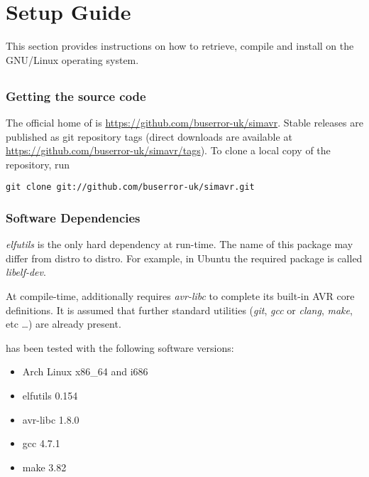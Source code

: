 \chapter{Setup Guide} \label{chapter:setup}

This section provides instructions on how to retrieve, compile and install
\simavr on the GNU/Linux operating system.

\section{\simavr} \label{section:setup_simavr}

\subsection{Getting the source code}

The official home of \simavr is \url{https://github.com/buserror-uk/simavr}.
Stable releases are published as git repository tags (direct downloads are
available at \url{https://github.com/buserror-uk/simavr/tags}). To clone a local
copy of the repository, run

\begin{verbatim}
git clone git://github.com/buserror-uk/simavr.git
\end{verbatim}

\subsection{Software Dependencies}

\emph{elfutils} is the only hard dependency at run-time. The name of this
package may differ from distro to distro. For example, in Ubuntu the required
package is called \emph{libelf-dev}.

At compile-time, \simavr additionally requires \emph{avr-libc} to complete its
built-in AVR core definitions. It is assumed that further standard
utilities (\emph{git}, \emph{gcc} or \emph{clang}, \emph{make}, etc \ldots) are
already present.

\simavr has been tested with the following software versions:

\begin{itemize}
\item Arch Linux x86\_64 and i686
\item elfutils 0.154
\item avr-libc 1.8.0
\item gcc 4.7.1
\item make 3.82
\end{itemize}

